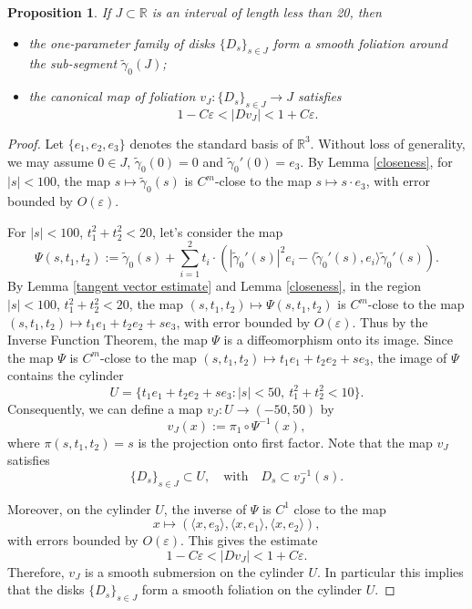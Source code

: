 \documentclass[a4paper, reqno]{amsart}
\newtheorem{proposition}[theorem]{Proposition}
\theoremstyle{definition}
\theoremstyle{remark}
\numberwithin{equation}{section}
\numberwithin{equation}{section}
\numberwithin{equation}{section}
\begin{document}
\begin{proposition}{\label{foliated disks}}
If $J\subset\mathbb{R}$ is an interval of length less than 20, then	
\begin{itemize}
\item[(i)] the one-parameter family of disks $\{D_s\}_{s\in J}$ form a smooth foliation around the sub-segment $\tilde{\gamma}_0(J)$;
\item[(ii)] the canonical map of foliation $v_J: \{D_s\}_{s\in J}\to J$ satisfies
	\[ 1-C\varepsilon < |Dv_J| < 1+C\varepsilon.\]	
\end{itemize}
\end{proposition}
\begin{proof}
	
	Let $\{e_1, e_2, e_3\}$ denotes the standard basis of $\mathbb{R}^3$. Without loss of generality, we may assume $0\in J$, $\tilde{\gamma}_0(0) = 0$ and $\tilde{\gamma}_0'(0) = e_3$. By Lemma \ref{closeness}, for $|s|<100$, the map $s\mapsto \tilde{\gamma}_0(s)$ is $C^m$-close to the map $s\mapsto s\cdot e_3$, with error bounded by $O(\varepsilon)$.
	
	For $|s|<100$, $t_1^2 + t_2^2 < 20$, let's consider the map		
	\begin{equation}
		 \Psi (s, t_1, t_2) := \tilde{\gamma}_0(s) + \sum_{i=1}^2 t_i\cdot \left(|\tilde{\gamma}_0'(s)|^2 e_i - \langle\tilde{\gamma}_0'(s), e_i\rangle\tilde{\gamma}_0'(s)\right).
	\end{equation}	
	By Lemma \ref{tangent vector estimate} and Lemma \ref{closeness}, in the region $|s|<100$, $t_1^2 + t_2^2 < 20$, the map $(s, t_1, t_2)\mapsto\Psi(s, t_1, t_2)$ is $C^m$-close to the map $(s, t_1, t_2)\mapsto t_1e_1 + t_2e_2 + s e_3$, with error bounded by $O(\varepsilon)$. Thus by the Inverse Function Theorem, the map $\Psi$ is a diffeomorphism onto its image. Since the map $\Psi$ is $C^m$-close to the map $(s, t_1, t_2)\mapsto t_1e_1 + t_2e_2 + s e_3$, the image of $\Psi$ contains the cylinder
	\[ U = \{t_1e_1 + t_2e_2 + s e_3: |s|< 50,\ t_1^2 + t_2^2 < 10 \}.\]	
	Consequently, we can define a map $v_J: U\to (-50, 50)$ by 
	\[ v_J (x) := \pi_1\circ\Psi^{-1}(x),\]
	where $\pi(s, t_1, t_2) = s$ is the projection onto first factor. Note that the map $v_J$ satisfies
	\[\{D_s\}_{s\in J}\subset U, \quad \text{with}\quad D_s\subset v_J^{-1}(s).\]
	
	Moreover, on the cylinder $U$, the inverse of $\Psi$ is $C^1$ close to the map
	\[ x \mapsto (\langle x, e_3\rangle, \langle x, e_1\rangle, \langle x, e_2\rangle),\]
	with errors bounded by $O(\varepsilon)$. This gives the estimate
	\[ 1-C\varepsilon < |Dv_J| < 1+C\varepsilon.\]	
	Therefore, $v_J$ is a smooth submersion on the cylinder $U$. In particular this implies that the disks $\{D_s\}_{s\in J}$ form a smooth foliation on the cylinder $U$.
\end{proof}
\end{document}
